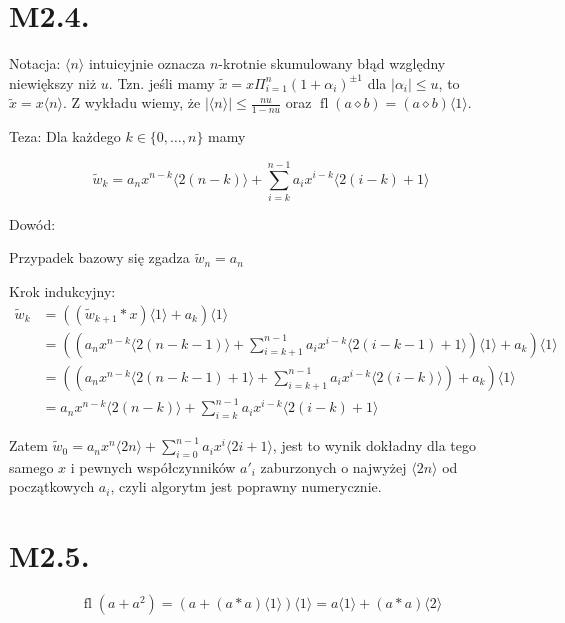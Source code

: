 \documentclass[a4paper, 12pt]{article}
\title{\vspace{-6ex}}
\author{Wiktor Kuchta}
\date{\vspace{-4ex}}
\DeclareMathOperator{\fl}{fl}
\begin{document}
\maketitle

\section*{M2.4.}

Notacja: $\langle n \rangle$ intuicyjnie oznacza $n$-krotnie skumulowany błąd względny niewiększy niż $u$.
Tzn. jeśli mamy $\tilde{x} = x \Pi_{i=1}^n (1+\alpha_i)^{\pm 1}$ dla $|\alpha_i| \le u$, to $\tilde{x} = x\langle n \rangle$.
Z wykładu wiemy, że $|\langle n \rangle| \le \frac{nu}{1-nu}$
oraz $\fl(a \diamond b) = (a \diamond b)\langle 1 \rangle$.


Teza: Dla każdego $k \in \{0, \dots, n\}$ mamy

$$\tilde{w}_{k} =   a_n x^{n-k} \langle 2(n-k) \rangle + \sum_{i=k}^{n-1}  a_i x^{i-k} \langle 2(i-k)+1 \rangle$$

Dowód:

Przypadek bazowy się zgadza $\tilde{w}_n = a_n$

Krok indukcyjny:
\begin{align*}
\tilde{w}_k
	&= ((\tilde{w}_{k+1} * x)\langle 1 \rangle + a_k)\langle 1 \rangle \\
	&= \left(\left(a_n x^{n-k} \langle 2(n-k-1)\rangle + \sum_{i=k+1}^{n-1} a_i x^{i-k} \langle 2(i-k-1)+1\rangle \right)
	    \langle 1 \rangle + a_k\right)\langle 1 \rangle \\
    &= \left(\left(a_n x^{n-k} \langle 2(n-k-1)+1\rangle + \sum_{i=k+1}^{n-1} a_i x^{i-k} \langle 2(i-k)\rangle \right)
	    + a_k\right)\langle 1 \rangle \\
	&= a_n x^{n-k} \langle 2(n-k)\rangle + \sum_{i=k}^{n-1} a_i x^{i-k} \langle 2(i-k)+1\rangle
\end{align*}

Zatem $\tilde{w}_0 = a_n x^n \langle 2n \rangle + \sum_{i=0}^{n-1} a_i x^i \langle 2i + 1 \rangle$,
jest to wynik dokładny dla tego samego $x$ i pewnych współczynników $a'_i$ zaburzonych o najwyżej
$\langle 2n \rangle$ od początkowych $a_i$, czyli algorytm jest poprawny numerycznie.

\section*{M2.5.}

$$\fl(a + a^2) = (a + (a*a)\langle 1 \rangle) \langle 1 \rangle = a\langle 1 \rangle + (a * a) \langle 2 \rangle$$
\end{document}
